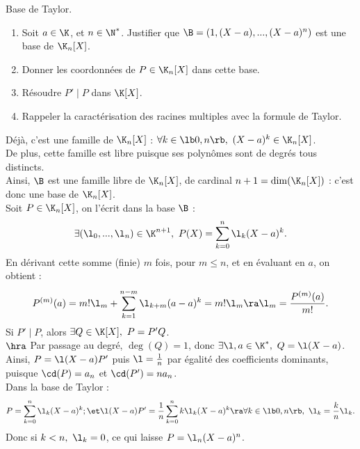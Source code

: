 \documentclass[11pt]{article}
\begin{document}
\vspace*{-0.7cm}

\begin{ex}{Base de Taylor.}{}
    \begin{enumerate}
        \item Soit $a\in\K$, et $n\in\N^*$. Justifier que $\B=(1,(X-a),...,(X-a)^n)$ est une base de $\K_n[X]$.
        \item Donner les coordonnées de $P\in\K_n[X]$ dans cette base.
        \item Résoudre $P' \mid P$ dans $\K[X]$.
        \item Rappeler la caractérisation des racines multiples avec la formule de Taylor.
    \end{enumerate}
    \tcblower
     Déjà, c'est une famille de $\K_n[X]$ : $\forall k \in \lb0,n\rb, ~ (X-a)^k \in \K_n[X]$.\\
    De plus, cette famille est libre puisque ses polynômes sont de degrés tous distincts.\\
    Ainsi, $\B$ est une famille libre de $\K_n[X]$, de cardinal $n+1=\dim(\K_n[X])$ : c'est donc une base de $\K_n[X]$.\\
     Soit $P\in\K_n[X]$, on l'écrit dans la base $\B$ :
    \begin{equation*}
        \exists (\l_0,...,\l_n) \in \K^{n+1}, ~ P(X) = \sum_{k=0}^n\l_k(X-a)^k.
    \end{equation*} 
    En dérivant cette somme (finie) $m$ fois, pour $m \leq n$, et en évaluant en $a$, on obtient :
    \begin{equation*}
        P^{(m)}(a) = m!\l_m + \sum_{k=1}^{n-m}\l_{k+m}(a-a)^k = m!\l_m \ra \l_m = \frac{P^{(m)}(a)}{m!}.
    \end{equation*}
     Si $P'\mid P$, alors $\exists Q \in \K[X], ~ P = P'Q$.\\
    $\hra$ Par passage au degré, $\deg(Q)=1$, donc $\exists \l,a \in \K^*, ~ Q = \l(X-a)$.\\
    Ainsi, $P=\l(X-a)P'$ puis $\l = \frac{1}{n}$ par égalité des coefficients dominants, puisque $\cd(P)=a_n$ et $\cd(P')=na_n$.\\
    Dans la base de Taylor :
    \begin{equation*}
        P = \sum_{k=0}^n\l_k(X-a)^k; \et \l(X-a)P' = \frac{1}{n}\sum_{k=0}^nk\l_k(X-a)^{k} \ra \forall k \in \lb0,n\rb, ~ \l_k = \frac{k}{n}\l_k.
    \end{equation*}
    Donc si $k<n, ~ \l_k = 0$, ce qui laisse $P=\l_n(X-a)^n$.
\end{ex}
\end{document}
